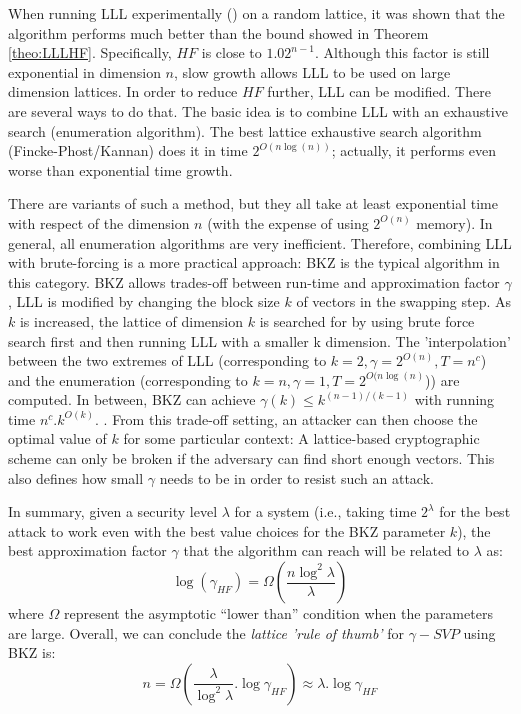 When running LLL experimentally (\cite{nguyen2006lll}) on a random lattice, it
was shown that the algorithm performs much better than the bound showed in
Theorem \ref{theo:LLLHF}. Specifically, $HF$ is close to $1.02^{n-1}$. Although
this factor is still exponential in dimension $n$, slow growth allows LLL to be
used on large dimension lattices. In order to reduce $HF$ further, LLL can be
modified. There are several ways to do that. The basic idea is to combine LLL
with an exhaustive search (enumeration algorithm). The best lattice exhaustive
search algorithm (Fincke-Phost/Kannan) does it in time $2^{O(n\log(n))}$;
actually, it performs even worse than exponential time growth.

There are variants of such a method, but they all take at least
exponential time with respect of the dimension $n$ (with the expense of using $2^{O(n)}$
memory). In general, all enumeration algorithms are very inefficient. Therefore,
combining LLL with brute-forcing is a more practical approach: BKZ is the typical
algorithm in this category.  BKZ allows trades-off between run-time and
approximation factor $\gamma$, LLL is modified by changing the block size $k$ of
vectors in the swapping step. As $k$ is increased, the lattice of
dimension $k$ is searched for by using brute force search first and then running LLL with a smaller k dimension. The 'interpolation' between the two extremes of LLL (corresponding to
$k = 2, \gamma = 2^{O(n)}, T = n^c$) and the enumeration (corresponding to
$k = n, \gamma=1, T = 2^{O(n\log(n)}$)) are computed. In between, BKZ can achieve
$\gamma(k) \leq k^{(n-1)/(k-1)}$ with running time
$n^c.k^{O(k)}$. \cite{hanrot2011terminating}. From this trade-off setting, an
attacker can then choose the optimal value of $k$ for some particular context: A
lattice-based cryptographic scheme can only be broken if the adversary can find
short enough vectors. This also defines how small $\gamma$ needs to be in order
to resist such an attack.

In summary, given a security level $\lambda$ for a system (i.e., taking
time $2^\lambda$ for the best attack to work even with the best value choices for the BKZ
parameter $k$), the best approximation factor $\gamma$ that the
algorithm can reach will be related to $\lambda$ as:
\[
  \log(\gamma_{HF}) = \Omega(\frac{n\log^2\lambda}{\lambda})
\]
where $\Omega$ represent the asymptotic ``lower than'' condition when the parameters
are large. Overall, we can conclude the \emph{lattice 'rule of thumb'} for
$\gamma-SVP$ using BKZ is:
\[
  n = \Omega(\frac{\lambda}{\log^2\lambda}.\log\gamma_{HF}) \approx \lambda
  . \log\gamma_{HF}
\]

